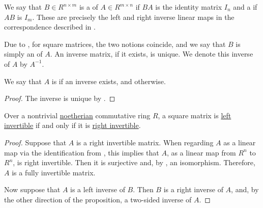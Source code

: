 \begin{definition}\label{def:inverse_matrix}
  We say that \( B \in R^{n \times m} \) is a  of \( A \in R^{m \times n} \) if \( BA \) is the identity matrix \( I_n \) and a  if \( AB \) is \( I_m \). These are precisely the left and right inverse linear maps in the correspondence described in .

  Due to , for square matrices, the two notions coincide, and we say that \( B \) is simply an  of \( A \). An inverse matrix, if it exists, is unique. We denote this inverse of \( A \) by \( A^{-1} \).

  We say that \( A \) is  if an inverse exists, and  otherwise.
\end{definition}
\begin{proof}
  The inverse is unique by .
\end{proof}

\begin{proposition}\label{thm:square_matrix_left_invertible_iff_right_invertible}
  Over a nontrivial \hyperref[def:noetherian_semiring]{noetherian} commutative ring \( R \), a square matrix is \hyperref[def:inverse_matrix]{left invertible} if and only if it is \hyperref[def:inverse_matrix]{right invertible}.
\end{proposition}
\begin{proof}
  \NecessitySubProof Suppose that \( A \) is a right invertible matrix. When regarding \( A \) as a linear map via the identification from , this implies that \( A \), as a linear map from \( R^n \) to \( R^n \), is right invertible. Then it is surjective and, by , an isomorphism. Therefore, \( A \) is a fully invertible matrix.

  \SufficiencySubProof Now suppose that \( A \) is a left inverse of \( B \). Then \( B \) is a right inverse of \( A \), and, by the other direction of the proposition, a two-sided inverse of \( A \).
\end{proof}

